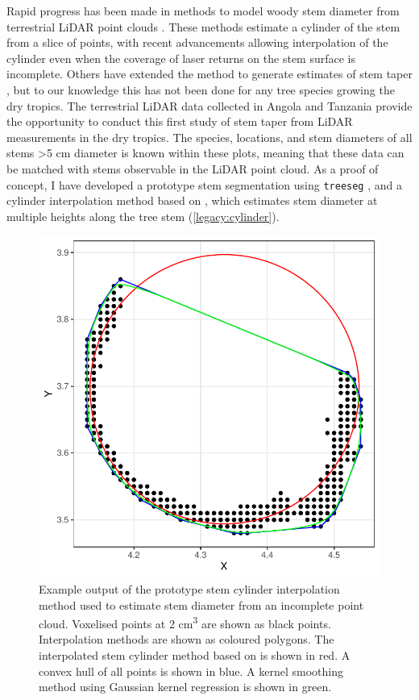 \begin{refsection}
Rapid progress has been made in methods to model woody stem diameter from terrestrial LiDAR point clouds \citep{Bogdanovich2021, Hopkinson2004, Srinivasan2015, Ravaglia2019, Wang2016}. These methods estimate a cylinder of the stem from a slice of points, with recent advancements allowing interpolation of the cylinder even when the coverage of laser returns on the stem surface is incomplete. Others have extended the method to generate estimates of stem taper \citep{Henning2006, Thies2004}, but to our knowledge this has not been done for any tree species growing the dry tropics. The terrestrial LiDAR data collected in Angola and Tanzania provide the opportunity to conduct this first study of stem taper from LiDAR measurements in the dry tropics. The species, locations, and stem diameters of all stems >5 cm diameter is known within these plots, meaning that these data can be matched with stems observable in the LiDAR point cloud. As a proof of concept, I have developed a prototype stem segmentation using \texttt{treeseg} \citep{Burt2018}, and a cylinder interpolation method based on \citet{Umbach2003}, which estimates stem diameter at multiple heights along the tree stem (\autoref{legacy:cylinder}).

\begin{figure}
	\includegraphics[width=0.6\linewidth]{img/cylinder}
	\caption[Stem cross section cylinder interpolation to estimate stem diameter from terrestrial LiDAR]{Example output of the prototype stem cylinder interpolation method used to estimate stem diameter from an incomplete point cloud. Voxelised points at 2 cm\textsuperscript{3} are shown as black points. Interpolation methods are shown as coloured polygons. The interpolated stem cylinder method based on \citet{Umbach2003} is shown in red. A convex hull of all points is shown in blue. A kernel smoothing method using Gaussian kernel regression is shown in green.}
	\label{legacy:cylinder}
\end{figure}




\end{refsection}
